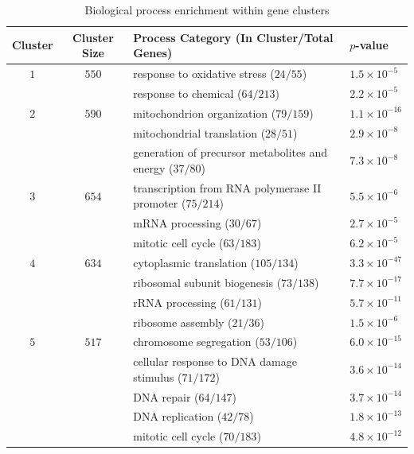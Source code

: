 \documentclass[12pt]{article}
\begin{document}
\begin{table}
\begin{center}
\captionsetup{justification=centering}
\caption{\label{table:enrich} Biological process enrichment within gene clusters}
\footnotesize
\begin{tabular}{ccll}
\toprule
Cluster & Cluster Size & Process Category (In Cluster/Total Genes) & $p$-value \\
\midrule
$1$ & $550$ & response to oxidative stress ($24/55$)  & $1.5\times10^{-5}$  \\
    &       & response to chemical ($64/213$)         & $2.2\times10^{-5}$  \\
$2$ & $590$ & mitochondrion organization ($79/159$)   & $1.1\times10^{-16}$ \\
    &       & mitochondrial translation ($28/51$)     & $2.9\times10^{-8}$  \\
    &       & generation of precursor metabolites and energy ($37/80$) & $7.3\times10^{-8}$ \\
$3$ & $654$ & transcription from RNA polymerase II promoter ($75/214$) & $5.5\times10^{-6}$ \\
    &       & mRNA processing ($30/67$)               & $2.7\times10^{-5}$  \\
    &       & mitotic cell cycle ($63/183$)           & $6.2\times10^{-5}$  \\
$4$ & $634$ & cytoplasmic translation ($105/134$)     & $3.3\times10^{-47}$ \\
    &       & ribosomal subunit biogenesis ($73/138$) & $7.7\times10^{-17}$ \\
    &       & rRNA processing ($61/131$)              & $5.7\times10^{-11}$ \\
    &       & ribosome assembly ($21/36$)             & $1.5\times10^{-6}$  \\
$5$ & $517$ & chromosome segregation ($53/106$)       & $6.0\times10^{-15}$ \\
    &       & cellular response to DNA damage stimulus ($71/172$)      & $3.6\times10^{-14}$ \\
    &       & DNA repair ($64/147$)                   & $3.7\times10^{-14}$ \\
    &       & DNA replication ($42/78$)               & $1.8\times10^{-13}$ \\
    &       & mitotic cell cycle ($70/183$)           & $4.8\times10^{-12}$ \\
\bottomrule
\end{tabular}
\end{center}
\hspace{0.5in} \footnotesize {}
\end{table} 
\end{document}
